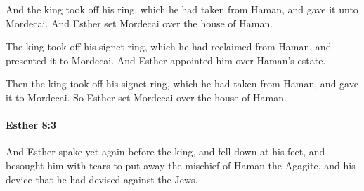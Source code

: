 			\begin{versebox}
					\item[BHS] 
					\item[LXX] 
					\item[ASV] And the king took off his ring, which he had taken from Haman, and gave it unto Mordecai. And Esther set Mordecai over the house of Haman.
					\item[NIV] The king took off his signet ring, which he had reclaimed from Haman, and presented it to Mordecai. And Esther appointed him over Haman’s estate.
					\item[NRSV] Then the king took off his signet ring, which he had taken from Haman, and gave it to Mordecai. So Esther set Mordecai over the house of Haman.
			\end{versebox}

		\paragraph{Esther 8:3} %
			\label{ESTHER-8-3}

			And Esther spake yet again before the king, and fell down at his feet, and besought him with tears to put away the mischief of Haman the Agagite, and his device that he had devised against the Jews.

